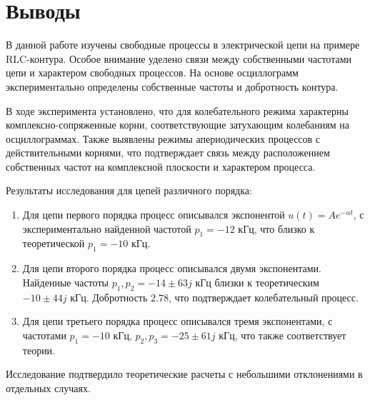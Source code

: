 \section{Выводы}

В данной работе изучены свободные процессы в электрической цепи на примере RLC-контура. Особое внимание уделено связи между собственными частотами цепи и характером свободных процессов. На основе осциллограмм экспериментально определены собственные частоты и добротность контура.

В ходе эксперимента установлено, что для колебательного режима характерны комплексно-сопряженные корни, соответствующие затухающим колебаниям на осциллограммах. Также выявлены режимы апериодических процессов с действительными корнями, что подтверждает связь между расположением собственных частот на комплексной плоскости и характером процесса.

Результаты исследования для цепей различного порядка:
\begin{enumerate}
    \item Для цепи первого порядка процесс описывался экспонентой \( u(t) = A e^{-\alpha t} \), с экспериментально найденной частотой \( p_1 = -12 \) кГц, что близко к теоретической \( p_1 = -10 \) кГц.
          
    \item Для цепи второго порядка процесс описывался двумя экспонентами. Найденные частоты \( p_1, p_2 = -14 \pm 63j \) кГц близки к теоретическим \( -10 \pm 44j \) кГц. Добротность \( 2.78 \), что подтверждает колебательный процесс.
          
    \item Для цепи третьего порядка процесс описывался тремя экспонентами, с частотами \( p_1 = -10 \) кГц, \( p_2, p_3 = -25 \pm 61j \) кГц, что также соответствует теории.
\end{enumerate}

Исследование подтвердило теоретические расчеты с небольшими отклонениями в отдельных случаях.
